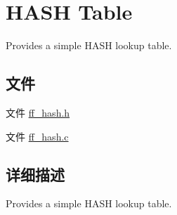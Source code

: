 \hypertarget{group___h_a_s_h}{}\section{H\+A\+SH Table}
\label{group___h_a_s_h}


Provides a simple H\+A\+SH lookup table.  


\subsection*{文件}
\begin{DoxyCompactItemize}
\item 
文件 \hyperlink{ff__hash_8h}{ff\+\_\+hash.\+h}
\item 
文件 \hyperlink{ff__hash_8c}{ff\+\_\+hash.\+c}
\end{DoxyCompactItemize}


\subsection{详细描述}
Provides a simple H\+A\+SH lookup table. 

